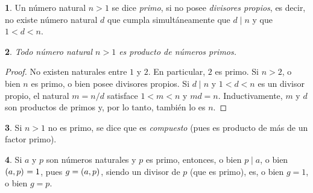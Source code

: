 \theoremstyle{plain}
\newtheorem{teoPrimos}{\teoname}[section]
\newtheorem{coroPrimos}[teoPrimos]{\coroname}
\newtheorem{lemaPrimos}[teoPrimos]{\lemaname}

\theoremstyle{definition}
\newtheorem{defPrimos}[teoPrimos]{}
\newtheorem{obsPrimos}[teoPrimos]{\obsname}


\begin{defPrimos}\label{def:primos}
	Un n\'umero natural $n>1$ se dice \emph{primo}, si no posee
	\emph{divisores propios}, es decir, no existe n\'umero natural $d$
	que cumpla simult\'aneamente que $d\mid n$ y que $1<d<n$.
\end{defPrimos}

\begin{teoPrimos}\label{teo:factorizacion}
	Todo n\'umero natural $n>1$ es producto de n\'umeros primos.
\end{teoPrimos}

\begin{proof}
	No existen naturales entre $1$ y $2$. En particular, $2$ es primo.
	Si $n>2$, o bien $n$ es primo, o bien posee divisores propios.
	Si $d\mid n$ y $1<d<n$ es un divisor propio, el natural $m=n/d$
	satisface $1<m<n$ y $md=n$.
	Inductivamente, $m$ y $d$ son productos de primos y, por lo tanto,
	tambi\'en lo es $n$.
\end{proof}

\begin{defPrimos}\label{def:compuesto}
	Si $n>1$ no es primo, se dice que es \emph{compuesto} (pues es
	producto de m\'as de un factor primo).
\end{defPrimos}

\begin{obsPrimos}\label{obs:primos:mcd}
	Si $a$ y $p$ son n\'umeros naturales y $p$ es primo, entonces,
	o bien $p\mid a$, o bien $\left({a,p}\right)_{}=1$, pues $g=\left({a,p}\right)_{}$, siendo
	un divisor de $p$ (que es primo), es, o bien $g=1$, o bien $g=p$.
\end{obsPrimos}

